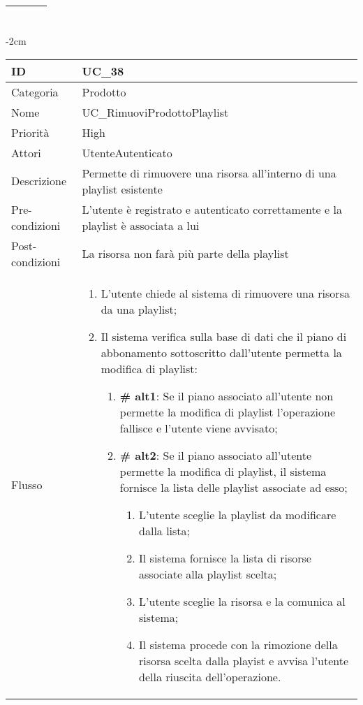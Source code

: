 \begin{center}
\begin{table}[bp]
\begin{tabular}{ |p{2.6cm}|p{13cm}|  }
\begin{enumerate}
		\end{enumerate}\\\hline
\end{tabular}
\label{table_use_case:37}\newline
\end{table}

\begin{table}[bp]
    \centering
    \addtolength{\leftskip} {-2cm}
\begin{tabular}{ |p{2.6cm}|p{13cm}|  }
\hline
ID & UC\_38\\\hline
Categoria & Prodotto \\\hline
Nome & UC\_RimuoviProdottoPlaylist\\\hline
Priorità & High \\\hline
Attori &  UtenteAutenticato \\\hline
Descrizione & Permette di rimuovere una risorsa all'interno di una playlist esistente\\\hline
Pre-condizioni & L'utente è registrato e autenticato correttamente e la playlist è associata a lui\\\hline
Post-condizioni & La risorsa non farà più parte della playlist\\\hline
Flusso &  	\vspace{-5mm} \begin{enumerate}
\item L'utente chiede al sistema di rimuovere una risorsa da una playlist;
		\item Il sistema verifica sulla base di dati che il piano di abbonamento sottoscritto dall'utente permetta la modifica di playlist:
		 \begin{enumerate}[label*=\arabic*.]
			\item \textbf{\# alt1}: Se il piano associato all'utente non permette la modifica di playlist l'operazione fallisce e l'utente viene avvisato;
			\item \textbf{\# alt2}: Se il piano associato all'utente permette la modifica di playlist, il sistema  fornisce la lista delle playlist associate ad esso;
			\begin{enumerate}[label*=\arabic*.]
				\item L'utente sceglie la playlist da modificare dalla lista;
				\item Il sistema fornisce la lista di risorse associate alla playlist scelta;
				\item L'utente sceglie la risorsa e la comunica al sistema;
				\item Il sistema procede con la rimozione della risorsa scelta dalla playist e avvisa l'utente della riuscita dell'operazione.
			\end{enumerate}
		\end{enumerate}
		\end{enumerate}\\\hline
\end{tabular}
\label{table_use_case:38}\newline
\end{table}


\end{center}
